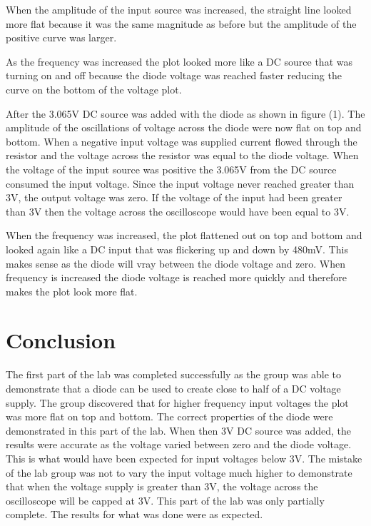 \documentclass[twocolumn, amsmath]{revtex4}
\begin{document}
When the amplitude of the input source was increased, the straight line looked more flat because it was the same magnitude as before but the amplitude of the positive curve was larger.

As the frequency was increased the plot looked more like a DC source that was turning on and off because the diode voltage was reached faster reducing the curve on the bottom of the voltage plot.

After the 3.065V DC source was added with the diode as shown in figure (1). The amplitude of the oscillations of voltage across the diode were now flat on top and bottom. When a negative input voltage was supplied current flowed through the resistor and the voltage across the resistor was equal to the diode voltage. When the voltage of the input source was positive the 3.065V from the DC source consumed the input voltage. Since the input voltage never reached greater than 3V, the output voltage was zero. If the voltage of the input had been greater than 3V then the voltage across the oscilloscope would have been equal to 3V.

When the frequency was increased, the plot flattened out on top and bottom and looked again like a DC input that was flickering up and down by 480mV. This makes sense as the diode will vray between the diode voltage and zero. When frequency is increased the diode voltage is reached more quickly and therefore makes the plot look more flat.





\section{Conclusion}
The first part of the lab was completed successfully as the group was able to demonstrate that a diode can be used to create close to half of a DC voltage supply. The group discovered that for higher frequency input voltages the plot was more flat on top and bottom. The correct properties of the diode were demonstrated in this part of the lab. When then 3V DC source was added, the results were accurate as the voltage varied between zero and the diode voltage. This is what would have been expected for input voltages below 3V. The mistake of the lab group was not to vary the input voltage much higher to demonstrate that when the voltage supply is greater than 3V, the voltage across the oscilloscope will be capped at 3V. This part of the lab was only partially complete. The results for what was done were as expected. 
\end{document}
